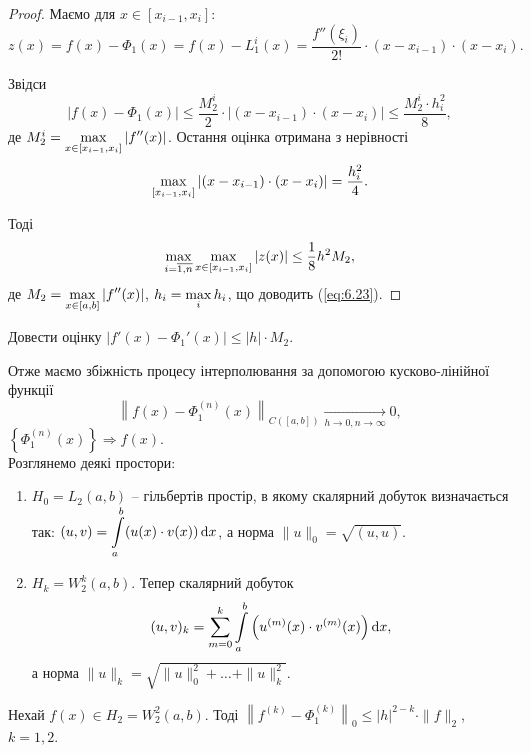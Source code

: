 \begin{proof}
    Маємо для $x \in [x_{i-1}, x_i]$:
    \[ z(x) = f(x) - \Phi_1(x) = f(x) - L_1^i(x) = \dfrac{f''(\xi_i)}{2!} \cdot(x-x_{i-1})\cdot(x-x_i). \]

    Звідси 
    \begin{equation}
        \label{eq:6.24}
        |f(x) - \Phi_1(x)| \le \dfrac{M_2^i}{2} \cdot |(x-x_{i-1}) \cdot (x - x_i)| \le \dfrac{M_2^i \cdot h_i^2}{8},
    \end{equation}
    де $M_2^i = \displaystyle\max\limits_{x\in[x_{i-1},x_i]} |f''(x)|$. Остання оцінка отримана з нерівності
    \[ \displaystyle\max\limits_{[x_{i-1},x_i]} |(x-x_{i-1}) \cdot (x - x_i)| = \dfrac{h_i^2}{4}. \]

    Тоді
    \begin{equation}
        \label{eq:6.25}
        \displaystyle\max\limits_{i=\overline{1,n}} \displaystyle\max\limits_{x\in[x_{i-1},x_i]} |z(x)| \le \dfrac18 h^2 M_2,
    \end{equation}
    де $M_2 = \displaystyle\max\limits_{x\in[a,b]} |f''(x)|$, $h_i = \displaystyle\max\limits_i h_i$, що доводить (\ref{eq:6.23}).
\end{proof}

\begin{problem}
    Довести оцінку $|f'(x) - \Phi_1'(x)| \le |h|\cdot M_2$.
\end{problem}

Отже маємо збіжність процесу інтерполювання за допомогою кусково-лінійної функції \[\left\|f(x)-\Phi_1^{(n)}(x)\right\|_{C([a,b])}\xrightarrow[h\to 0, n \to \infty]{}0,\] $\left\{\Phi_1^{(n)}(x)\right\} \Rightarrow f(x)$. \\

Розглянемо деякі простори:
\begin{enumerate}
    \item $H_0 = L_2(a,b)$ -- гільбертів простір, в якому скалярний добуток визначається так: $(u,v)=\displaystyle\int\limits_a^b (u(x) \cdot v(x)) \mathop{}\!\mathrm{d} x$, а норма $\|u\|_0 = \sqrt{(u,u)}$.

    \item $H_k = W_2^k(a,b)$. Тепер скалярний добуток \[(u,v)_k = \displaystyle\sum\limits_{m=0}^k \displaystyle\int\limits_a^b \left(u^{(m)}(x) \cdot v^{(m)}(x)\right) \mathop{}\!\mathrm{d} x,\] а норма $\|u\|_k = \sqrt{\|u\|_0^2 + \ldots + \|u\|_k^2}$.
\end{enumerate}

\begin{theorem}
    Нехай $f(x) \in H_2 = W_2^2(a,b)$. Тоді $\left\|f^{(k)}-\Phi_1^{(k)}\right\|_0 \le |h|^{2-k}\cdot \|f\|_2$, $k=1,2$. 
\end{theorem}

